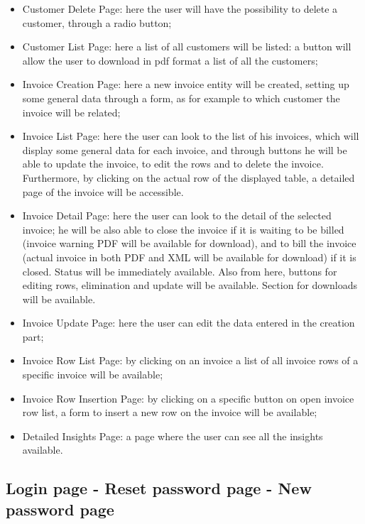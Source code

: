 \begin{itemize}
    \item Customer Delete Page: here the user will have the possibility to delete a customer, through a radio button;
    \item Customer List Page: here a list of all customers will be listed: a button will allow the user to download in pdf format a list of all the customers;
    \item Invoice Creation Page: here a new invoice entity will be created, setting up some general data through a form, as for example to which customer the invoice will be related;
    \item Invoice List Page: here the user can look to the list of his invoices, which will display some general data for each invoice, and through buttons he will be able to update the invoice, to edit the rows and to delete the invoice. Furthermore, by clicking on the actual row of the displayed table, a detailed page of the invoice will be accessible. 
    \item Invoice Detail Page: here the user can look to the detail of the selected invoice; he will be also able to close the invoice if it is waiting to be billed (invoice warning PDF will be available for download), and to bill the invoice (actual invoice in both PDF and XML will be available for download) if it is closed. Status will be immediately available. Also from here, buttons for editing rows, elimination and update will be available. Section for downloads will be available.
    \item Invoice Update Page: here the user can edit the data entered in the creation part;
    \item Invoice Row List Page: by clicking on an invoice a list of all invoice rows of a specific invoice will be available;
    \item Invoice Row Insertion Page: by clicking on a specific button on open invoice row list, a form to insert a new row on the invoice will be available;
    \item Detailed Insights Page: a page where the user can see all the insights available.
\end{itemize}



\subsection{Login page - Reset password page - New password page}

